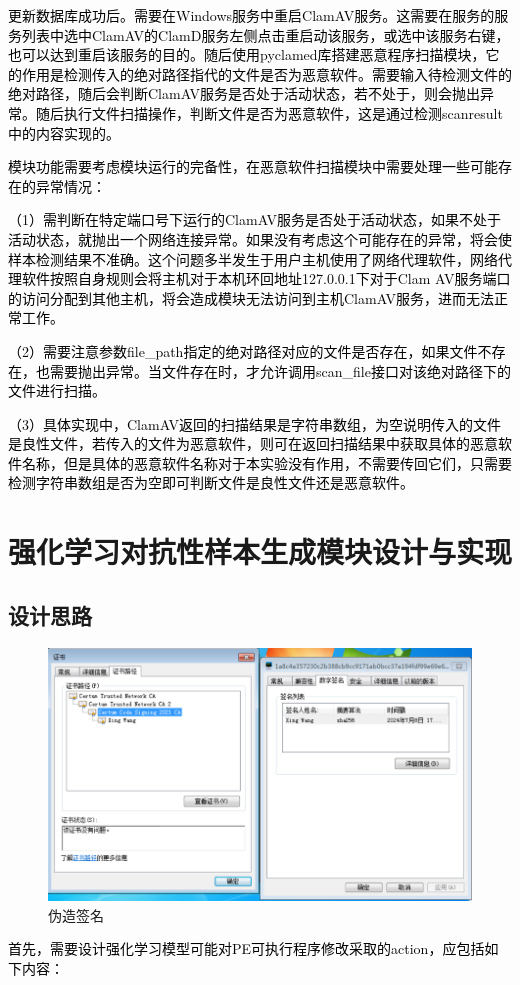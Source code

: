 \textcolor{black}{更新数据库成功后。需要在Windows服务中重启ClamAV服务。这需要在服务的服务列表中选中ClamAV的ClamD服务左侧点击重启动该服务，或选中该服务右键，也可以达到重启该服务的目的。随后使用pyclamed库搭建恶意程序扫描模块，它的作用是检测传入的绝对路径指代的文件是否为恶意软件。需要输入待检测文件的绝对路径，随后会判断ClamAV服务是否处于活动状态，若不处于，则会抛出异常。随后执行文件扫描操作，判断文件是否为恶意软件，这是通过检测scanresult中的内容实现的。}

\textcolor{black}{模块功能需要考虑模块运行的完备性，在恶意软件扫描模块中需要处理一些可能存在的异常情况：}

\textcolor{black}{（1）需判断在特定端口号下运行的ClamAV服务是否处于活动状态，如果不处于活动状态，就抛出一个网络连接异常。如果没有考虑这个可能存在的异常，将会使样本检测结果不准确。这个问题多半发生于用户主机使用了网络代理软件，网络代理软件按照自身规则会将主机对于本机环回地址127.0.0.1下对于Clam AV服务端口的访问分配到其他主机，将会造成模块无法访问到主机ClamAV服务，进而无法正常工作。}

\textcolor{black}{（2）需要注意参数file\_path指定的绝对路径对应的文件是否存在，如果文件不存在，也需要抛出异常。当文件存在时，才允许调用scan\_file接口对该绝对路径下的文件进行扫描。}

\textcolor{black}{（3）具体实现中，ClamAV返回的扫描结果是字符串数组，为空说明传入的文件是良性文件，若传入的文件为恶意软件，则可在返回扫描结果中获取具体的恶意软件名称，但是具体的恶意软件名称对于本实验没有作用，不需要传回它们，只需要检测字符串数组是否为空即可判断文件是良性文件还是恶意软件。}

\section{强化学习对抗性样本生成模块设计与实现}

\subsection{设计思路}

\begin{figure}
  \centering
  \includegraphics[]{images/certification_fabrication.png}
  \caption{伪造签名}\label{fig:certification_fabrication}
\end{figure}
\textcolor{black}{首先，需要设计强化学习模型可能对PE可执行程序修改采取的action，应包括如下内容：}

